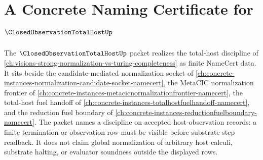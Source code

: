 \chapter{A Concrete Naming Certificate for $\ClosedObservationTotalHostUp$}
\label{ch:concrete-instances-closed-observation-total-host-namecert}

The $\ClosedObservationTotalHostUp$ packet realizes the total-host discipline of \autoref{ch:visions-strong-normalization-vs-turing-completeness} as finite NameCert data. It sits beside the candidate-mediated normalization socket of \autoref{ch:concrete-instances-normalization-candidate-socket-namecert}, the MetaCIC normalization frontier of \autoref{ch:concrete-instances-metacicnormalizationfrontier-namecert}, the total-host fuel handoff of \autoref{ch:concrete-instances-totalhostfuelhandoff-namecert}, and the reduction fuel boundary of \autoref{ch:concrete-instances-reductionfuelboundary-namecert}. The packet names a discipline on accepted host-observation records: a finite termination or observation row must be visible before substrate-step readback. It does not claim global normalization of arbitrary host calculi, substrate halting, or evaluator soundness outside the displayed rows.

